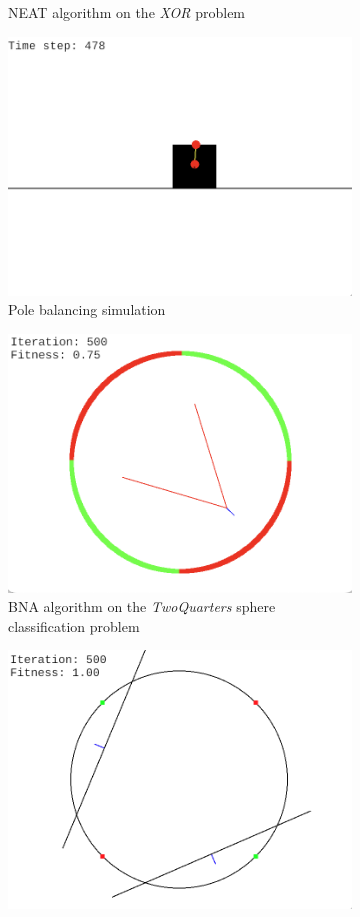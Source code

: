 \begin{figure}
\begin{subfigure}{0.5\textwidth}
        \caption{NEAT algorithm on the \textit{XOR} problem}
    \end{subfigure}%
    \hfill
    \begin{subfigure}{0.5\textwidth}
        \centering
        \includegraphics[width=0.8\linewidth]{Pictures/pole_balancing_gui}
        \caption{Pole balancing simulation}
    \end{subfigure}%
    \hfill
    \begin{subfigure}{0.5\textwidth}
        \centering
        \includegraphics[width=0.8\linewidth]{Pictures/bna_gui}
        \caption{BNA algorithm on the \textit{TwoQuarters} sphere classification problem}
    \end{subfigure}%
    \hfill
    \begin{subfigure}{0.5\textwidth}
        \centering
        \includegraphics[width=0.8\linewidth]{Pictures/oneplusonena_xor_gui}

\end{subfigure}
\end{figure}
